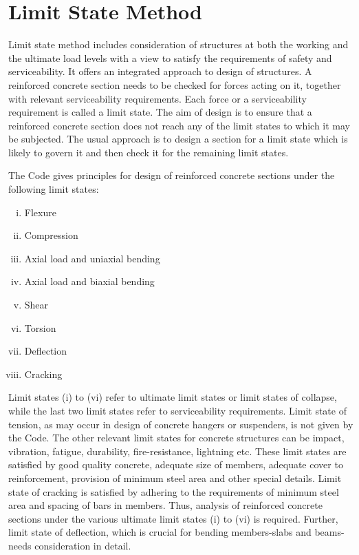 \section{Limit State Method}

Limit state method includes consideration of structures at both the
working and the ultimate load levels with a view to satisfy the
requirements of safety and serviceability. It offers an integrated
approach to design of structures. A reinforced concrete section needs 
to be checked for forces acting on it, together with relevant serviceability
requirements. Each force or a serviceability requirement is called a 
limit state. The aim of design is to ensure that a reinforced concrete
section does not reach any of the limit states to which it may be subjected.
The usual approach is to design a section for a limit state which is
likely to govern it and then check it for the remaining limit states.


The Code gives principles for design of reinforced concrete sections
under the following limit states: 

\begin{enumerate}[(i)]
\item Flexure
\item Compression
\item Axial load and uniaxial bending
\item Axial load and biaxial bending
\item Shear
\item Torsion
\item Deflection
\item Cracking
\end{enumerate}
Limit states (i) to (vi) refer to ultimate limit states or limit states
of collapse, while the last two limit states refer to serviceability 
requirements. Limit state of tension, as may occur in design of concrete 
hangers or suspenders, is not given by the Code. The other relevant limit
states for concrete structures can be impact, vibration, fatigue,
durability, ﬁre-resistance, lightning etc. These limit states are 
satisfied by good quality concrete, adequate size of members, adequate
cover to reinforcement, provision of minimum steel area and other special
details. Limit state of cracking is satisfied by adhering to the
requirements of minimum steel area and spacing of bars in members. Thus,
analysis of reinforced concrete sections under the various ultimate limit
states (i) to (vi) is required. Further, limit state of deflection, which
is crucial for bending members-slabs and beams-needs consideration in 
detail.

